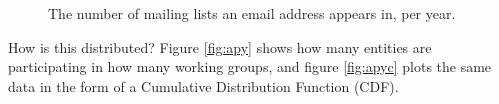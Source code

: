 \documentclass[a4paper,english]{report}
\begin{document}
\begin{figure}[H]
\caption{The number of mailing lists an email address appears in, per year.}
\end{figure}



How is this distributed?
Figure \ref{fig:apy} shows how many entities are participating in how many working groups, and figure \ref{fig:apyc} plots the same data in the form of a Cumulative Distribution Function (CDF).\\\\
\end{document}
